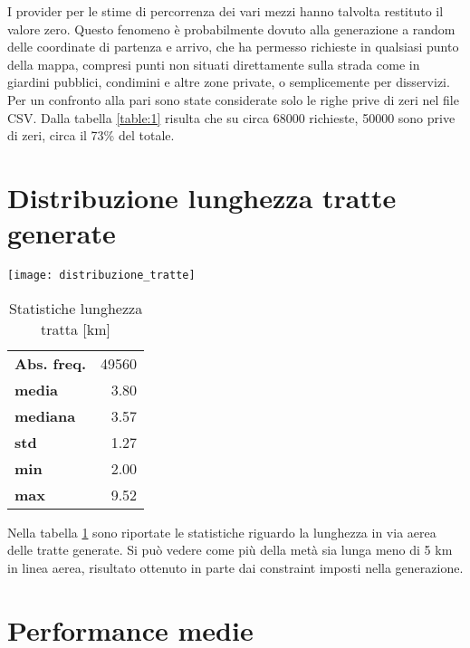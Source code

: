 I provider per le stime di percorrenza dei vari mezzi hanno talvolta restituto il valore zero. Questo fenomeno è probabilmente dovuto alla generazione a random delle coordinate di partenza e arrivo, che ha permesso richieste in qualsiasi punto della mappa, compresi punti non situati direttamente sulla strada come in giardini pubblici, condimini e altre zone private, o semplicemente per disservizi. Per un confronto alla pari sono state considerate solo le righe prive di zeri nel file CSV. Dalla tabella \ref{table:1}  risulta che su circa 68000 richieste, 50000 sono prive di zeri, circa il 73\% del totale.

\section{Distribuzione lunghezza tratte generate}

\begin{center}
\texttt{[image: distribuzione\_tratte]}
\end{center}

\begin{table}[H]
	\centering
	\begin{tabular}{ | l r | }
		\hline
		\textbf{Abs. freq.} & 49560 \\
		\textbf{media} & 3.80 \\
		\textbf{mediana} & 3.57 \\
		\textbf{std} & 1.27 \\
		\textbf{min} & 2.00 \\
		\textbf{max} & 9.52 \\
		\hline
	\end{tabular}
	\caption{Statistiche lunghezza tratta [km]}
	\label{table:2}
\end{table}

Nella tabella \ref{table:2} sono riportate le statistiche riguardo la lunghezza in via aerea delle tratte generate. Si può vedere come più della metà sia lunga meno di 5 km in linea aerea, risultato ottenuto in parte dai constraint imposti nella generazione.

\section{Performance medie}

